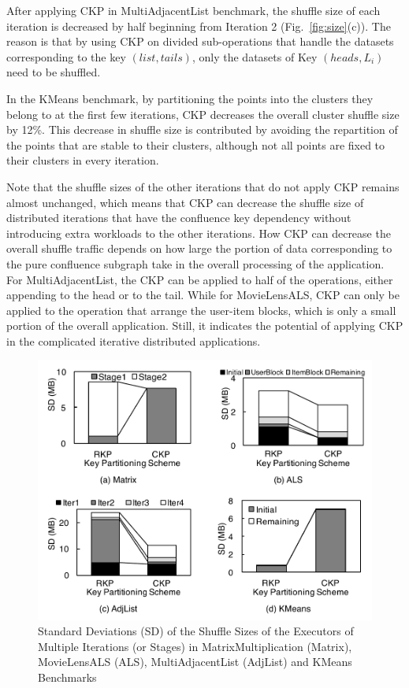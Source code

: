\documentclass[10pt,journal,compsoc]{IEEEtran}
\begin{document}
After applying CKP in MultiAdjacentList benchmark, the shuffle size of each iteration is decreased by half beginning from Iteration 2 (Fig.~\ref{fig:size}(c)). 
The reason is that by using CKP on divided sub-operations that handle the datasets corresponding to the key $(list, tails)$, only the datasets of Key  $(heads, L_i)$ need to be shuffled.

In the KMeans benchmark, by partitioning the points into the clusters they belong to at the first few iterations, CKP decreases the overall cluster shuffle size by 12\%. 
This decrease in shuffle size is contributed by avoiding the repartition of the points that are stable to their clusters,
although not all points are fixed to their clusters in every iteration. 

Note that the shuffle sizes of the other iterations that do not apply CKP remains almost unchanged, which means that CKP can decrease the shuffle size of distributed iterations that have the confluence key dependency without introducing extra workloads to the other iterations. 
How CKP can decrease the overall shuffle traffic depends on how large the portion of data corresponding to the pure confluence subgraph take in the overall processing of the application. 
For MultiAdjacentList, the CKP can be applied to half of the operations, either appending to the head or to the tail.
While for MovieLensALS, CKP can only be applied to the operation that arrange the user-item blocks, which is only a small portion of the overall application. 
Still, it indicates the potential of applying CKP in the complicated iterative distributed applications. 


\begin{figure}[!t]
\centering
\includegraphics[width=1\columnwidth]{figure6}
\caption{Standard Deviations (SD) of the Shuffle Sizes of the Executors of Multiple Iterations (or Stages) in MatrixMultiplication (Matrix), MovieLensALS (ALS), MultiAdjacentList (AdjList) and KMeans Benchmarks
}
\label{fig:SD}
\end{figure}
\end{document}
